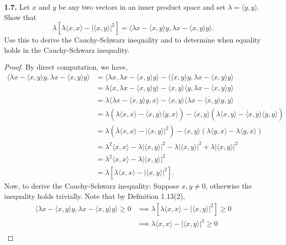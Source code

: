 \documentclass[12pt]{article}
\theoremstyle{definition}
\begin{document}
\noindent \textbf{1.7.} Let $x$ and $y$ be any two vectors in an inner product space and set $\lambda = \langle y, y \rangle$. Show that $$\lambda [\lambda \langle x, x\rangle - |\langle x, y \rangle|^2] = \langle \lambda x - \langle x, y\rangle y, \lambda x - \langle x, y \rangle y \rangle.$$ Use this to derive the Cauchy-Schwarz inequality and to determine when equality holds in the Cauchy-Schwarz inequality. 
	\begin{proof}
		By direct computation, we have,
			\begin{align*}
				\langle \lambda x - \langle x, y\rangle y, \lambda x - \langle x, y \rangle y \rangle &= \langle\lambda x, \lambda x - \langle x, y \rangle y\rangle - \langle \langle x, y \rangle y, \lambda x - \langle x, y \rangle y \rangle \\
				&= \lambda \langle x, \lambda x - \langle x, y\rangle y \rangle - \langle x, y \rangle \langle y, \lambda x - \langle x, y\rangle y \rangle \\
				&= \lambda \overline{\langle \lambda x - \langle x, y \rangle y, x\rangle} - \langle x, y \rangle \overline{\langle \lambda x - \langle x, y \rangle y, y\rangle} \\
				&= \lambda (\overline{\lambda\langle  x, x \rangle - \langle x, y\rangle \langle y, x\rangle}) - \langle x, y \rangle (\overline{\lambda \langle x, y\rangle - \langle x, y\rangle \langle y, y \rangle}) \\
				&= \lambda (\overline{\lambda} \langle x, x\rangle - |\langle x, y \rangle|^2) - \langle x, y \rangle (\lambda\langle y, x \rangle - \lambda \langle y, x\rangle ) \\
				&= \lambda^2 \langle x, x\rangle - \lambda |\langle x, y\rangle|^2 - \lambda |\langle x, y \rangle|^2 + \lambda |\langle x, y \rangle|^2 \\
				&= \lambda^2 \langle x, x\rangle - \lambda |\langle x, y \rangle|^2 \\
				&= \lambda [\lambda\langle x, x \rangle - |\langle x, y \rangle|^2].
			\end{align*}
		Now, to derive the Cauchy-Schwarz inequality: Suppose $x, y \neq 0$, otherwise the inequality holds trivially. Note that by Definition 1.13(2), 
			\begin{align*}
				\langle \lambda x - \langle x, y \rangle y, \lambda x - \langle x, y \rangle y \rangle \geq 0 &\implies \lambda [\lambda \langle x, x \rangle - |\langle x, y \rangle|^2] \geq 0 \\
				&\implies \lambda \langle x, x \rangle - |\langle x, y \rangle|^2 \geq 0\\ 

\end{align*}
\end{proof}
\end{document}
